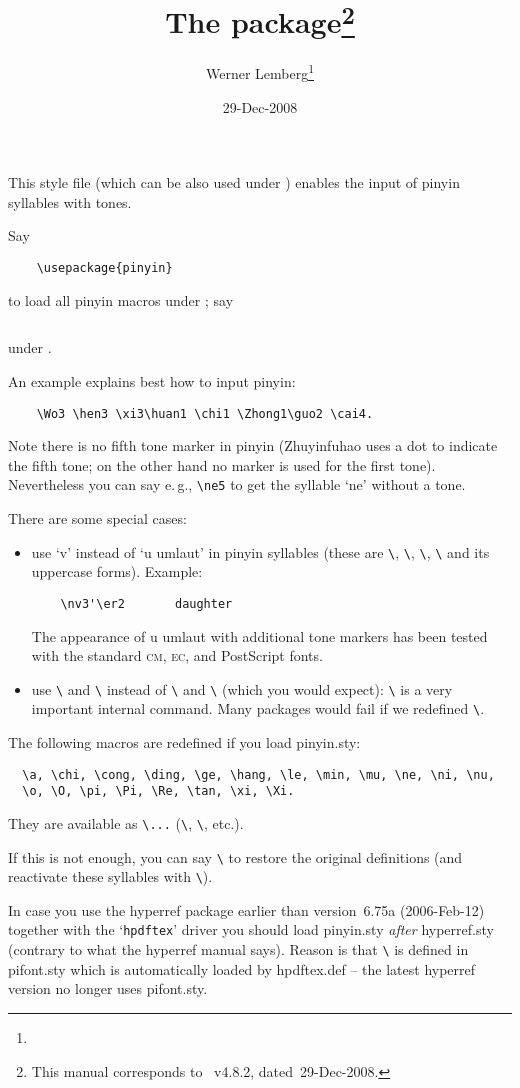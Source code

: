 \documentclass[pagesize=auto, fontsize=12pt, DIV=10, parskip=half]{scrartcl}
\title{The \pkg{pinyin} package\thanks{This manual corresponds to \pkg{pinyin.sty}~v4.8.2, dated~29-Dec-2008.}}
\author{Werner Lemberg\thanks{\mail{wl@gnu.org}}}
\date{29-Dec-2008}
\makeatletter
\newcommand*{\pkg}[1]{\textsf{#1}}
\newcommand*{\cs}[1]{\texttt{\textbackslash#1}}
\newcommand*{\cmd}[1]{\cs{\expandafter\@gobble\string#1}}
\newcommand*{\opt}[1]{\texttt{#1}}
\makeatother
\begin{document}
\maketitle

This style file (which can be also used under ) enables the input
of pinyin syllables with tones.

Say
%
\begin{verbatim}
    \usepackage{pinyin}
\end{verbatim}
%
to load all pinyin macros under ; say
%
\begin{verbatim}

\end{verbatim}
%
under .

An example explains best how to input pinyin:
%
\begin{verbatim}
    \Wo3 \hen3 \xi3\huan1 \chi1 \Zhong1\guo2 \cai4.
\end{verbatim}
%
Note there is no fifth tone marker in pinyin (Zhuyinfuhao uses a dot to
indicate the fifth tone; on the other hand no marker is used for the first
tone). Nevertheless you can say e.\,g.\@, \verb+\ne5+ to get the syllable `ne' without a
tone.

There are some special cases: 

\begin{itemize}
\item
  use `v' instead of `u umlaut' in pinyin syllables (these are \cmd{\lv},
  \cmd{\lve}, \cmd{\nv}, \cmd{\nve} and its uppercase forms). Example:
\begin{verbatim}
    \nv3'\er2       daughter
\end{verbatim}
  The appearance of u umlaut with additional tone markers has been
  tested with the standard \textsc{cm}, \textsc{ec}, and PostScript fonts.

\item use \cmd{\Long} and \cmd{\LONG} instead of \cmd{\long} and \cmd{\Long} (which you would
  expect): \cmd{\long} is a very important internal  command. Many
  packages would fail if we redefined \cmd{\long}.
\end{itemize}



The following macros are redefined if you load pinyin.sty:
%
\begin{verbatim}
  \a, \chi, \cong, \ding, \ge, \hang, \le, \min, \mu, \ne, \ni, \nu,
  \o, \O, \pi, \Pi, \Re, \tan, \xi, \Xi.
\end{verbatim}
%
They are available as \cmd{\PY...} (\cmd{\PYchi}, \cmd{\PYcong}, etc.).

If this is not enough, you can say \cmd{\PYdeactivate} to restore the original
definitions (and reactivate these syllables with \cmd{\PYactivate}).

In case you use the \pkg{hyperref} package earlier than version~6.75a
(2006-Feb-12) together with the `\opt{hpdftex}' driver you should load
\pkg{pinyin.sty} \emph{after} \pkg{hyperref.sty} (contrary to what the \pkg{hyperref} manual
says). Reason is that \cmd{\ding} is defined in \pkg{pifont.sty} which is
automatically loaded by \pkg{hpdftex.def} -- the latest \pkg{hyperref} version no
longer uses \pkg{pifont.sty}.
\end{document}

